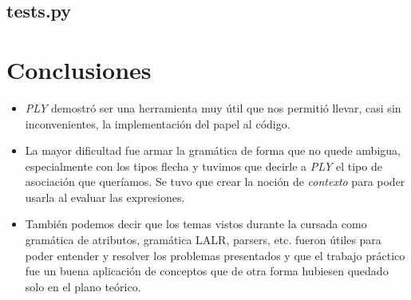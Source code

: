 \documentclass[spanish, a4paper]{article}
\begin{document}
\subsection{tests.py}
      

\newpage
\section{Conclusiones}
\begin{itemize}
\item \textit{PLY} demostró ser una herramienta muy útil que nos permitió llevar, casi sin inconvenientes, la implementación del papel al código.

\item La mayor dificultad fue armar la gramática de forma que no quede ambigua, especialmente con los tipos flecha y tuvimos que decirle a \textit{PLY} el tipo de asociación que queríamos. Se tuvo que crear la noción de \textit{contexto} para poder usarla al evaluar las expresiones.

\item También podemos decir que los temas vistos durante la cursada como gramática de atributos, gramática LALR, parsers, etc. fueron útiles para poder entender y resolver los problemas presentados y que el trabajo práctico fue un buena aplicación de conceptos que de otra forma hubiesen quedado solo en el plano teórico.
\end{itemize}

%

\end{document}
